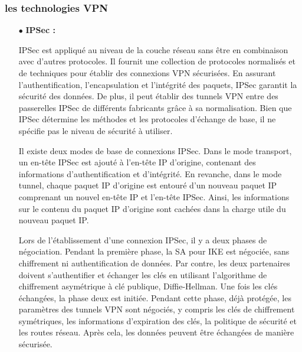   \subsubsection{les technologies VPN  }
  \begin{itemize}
  	\item[$\bullet$]\textbf{ IPSec :} 
  	
  	IPSec est appliqué au niveau de la couche réseau sans être en combinaison avec d'autres protocoles. Il fournit une collection de protocoles normalisés et de techniques pour établir des connexions VPN sécurisées. En assurant l’authentification, l’encapsulation et l’intégrité des paquets, IPSec garantit la sécurité des données. De plus, il peut établir des tunnels VPN entre des passerelles IPSec de différents fabricants grâce à sa normalisation. Bien que IPSec détermine les méthodes et les protocoles d'échange de base, il ne spécifie pas le niveau de sécurité à utiliser.
  	
  	Il existe deux modes de base de connexions IPSec. Dans le mode transport, un en-tête IPSec est ajouté à l'en-tête IP d'origine, contenant des informations d'authentification et d'intégrité. En revanche, dans le mode tunnel, chaque paquet IP d'origine est entouré d'un nouveau paquet IP comprenant un nouvel en-tête IP et l'en-tête IPSec. Ainsi, les informations sur le contenu du paquet IP d'origine sont cachées dans la charge utile du nouveau paquet IP.
  	
  	Lors de l'établissement d'une connexion IPSec, il y a deux phases de négociation. Pendant la première phase, la SA pour IKE est négociée, sans chiffrement ni authentification de données. Par contre, les deux partenaires doivent s'authentifier et échanger les clés en utilisant l'algorithme de chiffrement asymétrique à clé publique, Diffie-Hellman. Une fois les clés échangées, la phase deux est initiée. Pendant cette phase, déjà protégée, les paramètres des tunnels VPN sont négociés, y compris les clés de chiffrement symétriques, les informations d'expiration des clés, la politique de sécurité et les routes réseau. Après cela, les données peuvent être échangées de manière sécurisée.
  \end{itemize}
